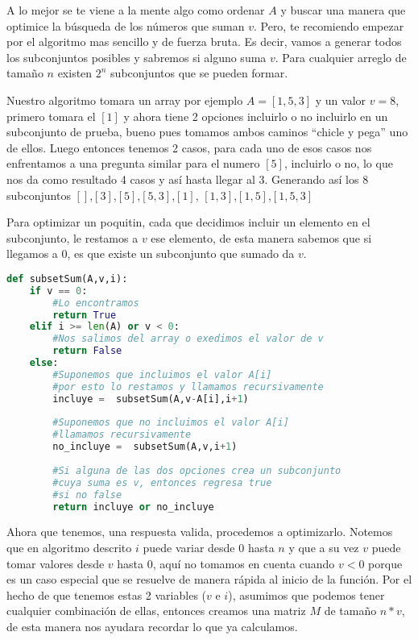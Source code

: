 A lo mejor se te viene a la mente algo como ordenar $A$ y buscar una manera que optimice la búsqueda de los números que suman $v$. Pero, te recomiendo empezar por el algoritmo mas sencillo y de fuerza bruta. Es decir, vamos a generar todos los subconjuntos posibles y sabremos si alguno suma $v$. Para cualquier arreglo de tamaño $n$ existen $2^n$ subconjuntos que se pueden formar.

Nuestro algoritmo tomara un array por ejemplo $A=[1,5,3]$ y un valor $v=8$, primero tomara el $[1]$ y ahora tiene 2 opciones incluirlo o no incluirlo en un subconjunto de prueba, bueno pues tomamos ambos caminos ``chicle y pega'' uno de ellos. Luego entonces tenemos 2 casos, para cada uno de esos casos nos enfrentamos a una pregunta similar para el numero $[5]$, incluirlo o no, lo que nos da como resultado 4 casos y así hasta llegar al 3. Generando así los 8 subconjuntos $[]$,$[3]$,$[5]$,$[5,3]$,$[1]$,  $[1,3]$,$[1,5]$,$[1,5,3]$

Para optimizar un poquitin,  cada que decidimos incluir un elemento en el subconjunto, le restamos a $v$ ese elemento, de esta manera sabemos que si llegamos a 0, es que existe un subconjunto que sumado da $v$.
 
\begin{lstlisting}[language=Python, caption=Subset sum no optimo]
def subsetSum(A,v,i):
    if v == 0:
        #Lo encontramos
        return True
    elif i >= len(A) or v < 0:
        #Nos salimos del array o exedimos el valor de v
        return False
    else:
        #Suponemos que incluimos el valor A[i]
        #por esto lo restamos y llamamos recursivamente
        incluye =  subsetSum(A,v-A[i],i+1)
        
        #Suponemos que no incluimos el valor A[i]
        #llamamos recursivamente
        no_incluye =  subsetSum(A,v,i+1)
        
        #Si alguna de las dos opciones crea un subconjunto
        #cuya suma es v, entonces regresa true
        #si no false
        return incluye or no_incluye
\end{lstlisting}

Ahora que tenemos, una respuesta valida, procedemos a optimizarlo. Notemos que en algoritmo descrito $i$ puede variar desde 0 hasta $n$ y que a su vez $v$ puede tomar valores desde $v$ hasta $0$, aquí no tomamos en cuenta cuando $v < 0$ porque es un caso especial que se resuelve de manera rápida al inicio de la función. Por el hecho de que tenemos estas 2 variables ($v$ e $i$), asumimos que podemos tener cualquier combinación de ellas, entonces creamos una matriz $M$ de tamaño $n*v$, de esta manera nos ayudara recordar lo que ya calculamos.


